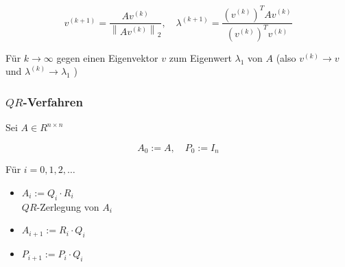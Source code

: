 $$
v^{(k+1)}=\frac{A v^{(k)}}{\left\|A v^{(k)}\right\|_{2}}, \quad \lambda^{(k+1)}=\frac{\left(v^{(k)}\right)^{T} A v^{(k)}}{\left(v^{(k)}\right)^{T} v^{(k)}}
$$

Für $k \rightarrow \infty$ gegen einen Eigenvektor $v$ zum Eigenwert $\lambda_{1}$ von $A$ (also $v^{(k)} \rightarrow v$ und $\lambda^{(k)} \rightarrow \lambda_{1}$ )

\subsubsection*{$Q R$-Verfahren}
Sei $A \in R^{n \times n}$

$$
A_{0}:=A, \quad P_{0}:=I_{n}
$$

Für $i=0,1,2, \ldots$

\begin{itemize}
  \item $A_{i}:=Q_{i} \cdot R_{i}$\\
$Q R$-Zerlegung von $A_{i}$
  \item $A_{i+1}:=R_{i} \cdot Q_{i}$
  \item $P_{i+1}:=P_{i} \cdot Q_{i}$
\end{itemize}


